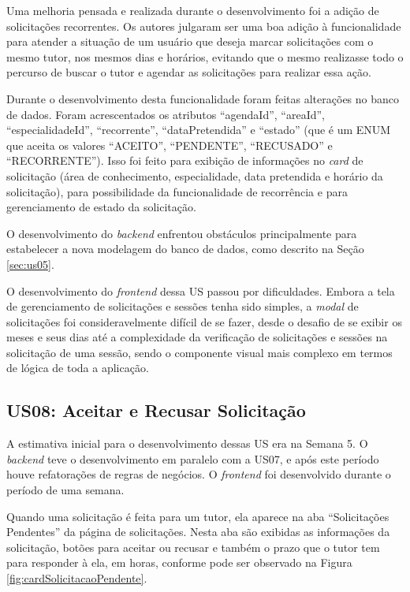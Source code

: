 Uma melhoria pensada e realizada durante o desenvolvimento foi a adição de solicitações recorrentes. Os autores julgaram ser uma boa adição à funcionalidade para atender a situação de um usuário que deseja marcar solicitações com o mesmo tutor, nos mesmos dias e horários, evitando que o mesmo realizasse todo o percurso de buscar o tutor e agendar as solicitações para realizar essa ação.

Durante o desenvolvimento desta funcionalidade foram feitas alterações no banco de dados. Foram acrescentados os atributos ``agendaId'', ``areaId'', ``especialidadeId'', ``recorrente'', ``dataPretendida'' e ``estado'' (que é um ENUM que aceita os valores ``ACEITO'', ``PENDENTE'', ``RECUSADO'' e ``RECORRENTE''). Isso foi feito para exibição de informações no \textit{card} de solicitação (área de conhecimento, especialidade, data pretendida e horário da solicitação), para possibilidade da funcionalidade de recorrência e para gerenciamento de estado da solicitação.

O desenvolvimento do \textit{backend} enfrentou obstáculos principalmente para estabelecer a nova modelagem do banco de dados, como descrito na Seção \ref{sec:us05}.

O desenvolvimento do \textit{frontend} dessa US passou por dificuldades. Embora a tela de gerenciamento de solicitações e sessões tenha sido simples, a \textit{modal} de solicitações foi consideravelmente difícil de se fazer, desde o desafio de se exibir os meses e seus dias até a complexidade da verificação de solicitações e sessões na solicitação de uma sessão, sendo o componente visual mais complexo em termos de lógica de toda a aplicação.  

\subsection[US08: Aceitar e Recusar Solicitação]{US08: Aceitar e Recusar Solicitação}

A estimativa inicial para o desenvolvimento dessas US era na Semana 5. O \textit{backend} teve o desenvolvimento em paralelo com a US07, e após este período houve refatorações de regras de negócios. O \textit{frontend} foi desenvolvido durante o período de uma semana.

Quando uma solicitação é feita para um tutor, ela aparece na aba ``Solicitações Pendentes'' da página de solicitações. Nesta aba são exibidas as informações da solicitação, botões para aceitar ou recusar e também o prazo que o tutor tem para responder à ela, em horas, conforme pode ser observado na Figura \ref{fig:cardSolicitacaoPendente}.

